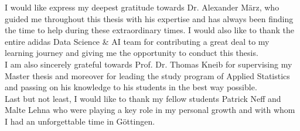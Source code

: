 
\vspace{2cm}



I would like express my deepest gratitude towards Dr. Alexander März, who guided me throughout this thesis with his expertise and has always been finding the time to help during these extraordinary times. I would also like to thank the entire adidas Data Science \& AI team for contributing a great deal to my learning journey and giving me the opportunity to conduct this thesis.\\
I am also sincerely grateful towards Prof. Dr. Thomas Kneib for supervising my Master thesis and moreover for leading the study program of Applied Statistics and passing on his knowledge to his students in the best way possible.\\
Last but not least, I would like to thank my fellow students Patrick Neff and Malte Lehna who were playing a key role in my personal growth and with whom I had an unforgettable time in Göttingen. 

\vspace{1cm}


\textbf{}


